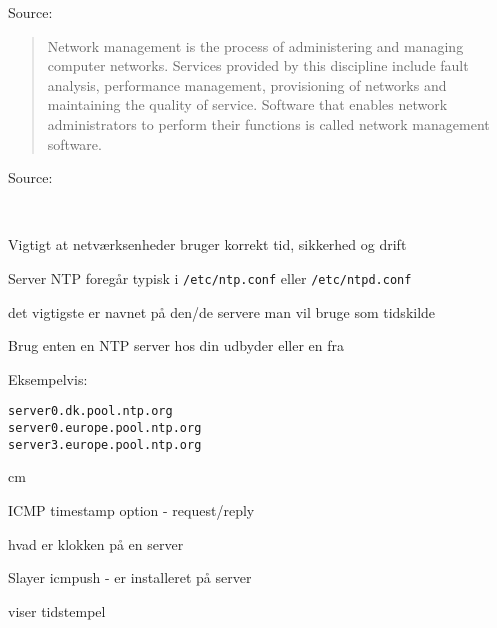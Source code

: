 \documentclass[Screen16to9,17pt]{foils}
\begin{document}



Source:\\{\footnotesize
{}}






\begin{quote}
Network management is the process of administering and managing computer networks. Services provided by this discipline include fault analysis, performance management, provisioning of networks and maintaining the quality of service. Software that enables network administrators to perform their functions is called network management software.\\
\end{quote}

Source:\\{\footnotesize
{}}



{~}

\begin{list1}
\item Vigtigt at netværksenheder bruger korrekt tid, sikkerhed og drift
\item Server NTP foregår typisk i \verb+/etc/ntp.conf+ eller \verb+/etc/ntpd.conf+
\item det vigtigste er navnet på den/de servere man vil bruge som tidskilde
\item Brug enten en NTP server hos din udbyder eller en fra 
\item Eksempelvis:
\end{list1}

\begin{alltt}
server 0.dk.pool.ntp.org
server 0.europe.pool.ntp.org
server 3.europe.pool.ntp.org

\end{alltt}


 cm

\begin{list1}
  \item ICMP timestamp option - request/reply
\item hvad er klokken på en server
\item Slayer icmpush - er installeret på server
\item viser tidstempel
\end{list1}
\end{document}
